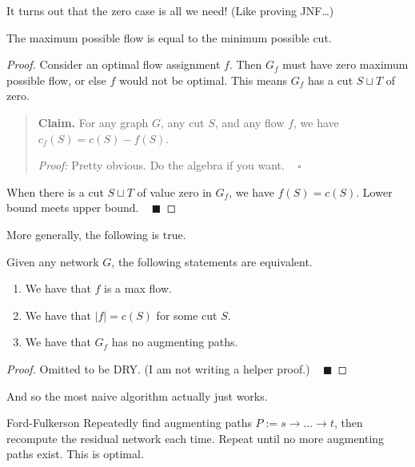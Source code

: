 It turns out that the zero case is all we need!  (Like proving JNF\dots)

\begin{claim}
    The maximum possible flow is equal to the minimum possible cut.
\end{claim}

\begin{proof}
    Consider an optimal flow assignment $f$.  Then $G_f$ must have zero maximum possible flow, or else $f$ would not be optimal.  This means $G_f$ has a cut $S \sqcup T$ of zero.

    \begin{quote}
        \textbf{Claim.} For any graph $G$, any cut $S$, and any flow $f$, we have $c_f(S) = c(S) - f(S)$.

        \emph{Proof:} Pretty obvious.  Do the algebra if you want. ~ $\square$
    \end{quote}    
    When there is a cut $S \sqcup T$ of value zero in $G_f$, we have $f(S) = c(S)$.  Lower bound meets upper bound. ~ $\blacksquare$
\end{proof}

More generally, the following is true.

\begin{claim}
    Given any network $G$, the following statements are equivalent.
    \begin{enumerate}
        \item We have that $f$ is a max flow.
        \item We have that $|f| = c(S)$ for some cut $S$.
        \item We have that $G_f$ has no augmenting paths.
    \end{enumerate}
\end{claim}

\begin{proof}
    Omitted to be DRY.  (I am not writing a helper proof.) ~ $\blacksquare$
\end{proof}

And so the most naive algorithm actually just works.

\begin{solution}{Ford-Fulkerson}
    Repeatedly find augmenting paths $P := s \to \dots \to t$, then recompute the residual network each time.  Repeat until no more augmenting paths exist.  This is optimal.
\end{solution}

